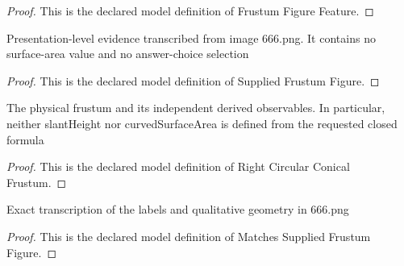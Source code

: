\begin{proof}
  This is the declared model definition of Frustum Figure Feature.
\end{proof}
\begin{definition}
  \label{def:physics:phyx-mini-0666:phyxminiproblems-problemphyxmini0666-suppliedfrustumfigure}
  Presentation-level evidence transcribed from image 666.png. It contains no surface-area value and no answer-choice selection
\end{definition}
\begin{proof}
  This is the declared model definition of Supplied Frustum Figure.
\end{proof}
\begin{definition}
  \label{def:physics:phyx-mini-0666:phyxminiproblems-problemphyxmini0666-rightcircularconicalfrustum}
  The physical frustum and its independent derived observables. In particular, neither slantHeight nor curvedSurfaceArea is defined from the requested closed formula
\end{definition}
\begin{proof}
  This is the declared model definition of Right Circular Conical Frustum.
\end{proof}
\begin{definition}
  \label{def:physics:phyx-mini-0666:phyxminiproblems-problemphyxmini0666-matchessuppliedfrustumfigure}
  Exact transcription of the labels and qualitative geometry in 666.png
\end{definition}
\begin{proof}
  This is the declared model definition of Matches Supplied Frustum Figure.
\end{proof}

